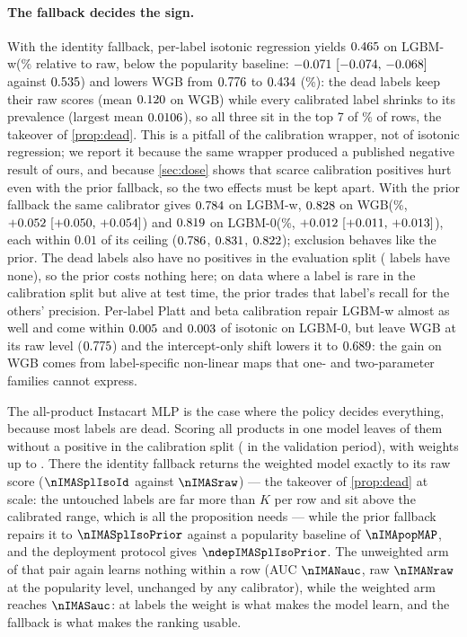 \documentclass[sigconf,nonacm]{acmart}
\newcommand{\Sm}{\textsf{LGBM-w}\xspace}
\newcommand{\Wm}{\textsf{WGB}\xspace}
\newcommand{\Nm}{\textsf{LGBM-0}\xspace}
\begin{document}
\paragraph{The fallback decides the sign.} With the identity fallback, per-label isotonic regression yields $0.465$ on \Sm (\nSplIsoIdRel\% relative to raw, below the popularity baseline: $-0.071~[-0.074,\,-0.068]$ against $0.535$) and lowers \Wm from $0.776$ to $0.434$ (\nWplIsoIdRel\%): the \nSnDead{} dead labels keep their raw scores (mean $0.120$ on \Wm) while every calibrated label shrinks to its prevalence (largest mean $0.0106$), so all three sit in the top 7 of \nWdeadAllRowsPct\% of rows, the takeover of \cref{prop:dead}. This is a pitfall of the calibration wrapper, not of isotonic regression; we report it because the same wrapper produced a published negative result of ours, and because \cref{sec:dose} shows that scarce calibration positives hurt even with the prior fallback, so the two effects must be kept apart. With the prior fallback the same calibrator gives $0.784$ on \Sm, $0.828$ on \Wm (\nWplIsoPriorRel\%, $+0.052~[+0.050,\,+0.054]$) and $0.819$ on \Nm (\nNplIsoPriorRel\%, $+0.012~[+0.011,\,+0.013]$), each within $0.01$ of its ceiling ($0.786$, $0.831$, $0.822$); exclusion behaves like the prior. The \nSnDead{} dead labels also have no positives in the evaluation split (\nnDeadTest{} labels have none), so the prior costs nothing here; on data where a label is rare in the calibration split but alive at test time, the prior trades that label's recall for the others' precision. Per-label Platt and beta calibration repair \Sm almost as well and come within $0.005$ and $0.003$ of isotonic on \Nm, but leave \Wm at its raw level ($0.775$) and the intercept-only shift lowers it to $0.689$: the gain on \Wm comes from label-specific non-linear maps that one- and two-parameter families cannot express.

The all-product Instacart MLP is the case where the policy decides everything, because most labels are dead. Scoring all \nIMAnLabels{} products in one model leaves \nIMASnDead{} of them without a positive in the calibration split (\nIMASnDeadVal{} in the validation period), with weights up to \nIMAwMax. There the identity fallback returns the weighted model exactly to its raw score ($\nIMASplIsoId$ against $\nIMASraw$) --- the takeover of \cref{prop:dead} at scale: the untouched labels are far more than $K$ per row and sit above the calibrated range, which is all the proposition needs --- while the prior fallback repairs it to $\nIMASplIsoPrior$ against a popularity baseline of $\nIMApopMAP$, and the deployment protocol gives $\ndepIMASplIsoPrior$. The unweighted arm of that pair again learns nothing within a row (AUC $\nIMANauc$, raw $\nIMANraw$ at the popularity level, unchanged by any calibrator), while the weighted arm reaches $\nIMASauc$: at \nIMAnLabels{} labels the weight is what makes the model learn, and the fallback is what makes the ranking usable.
\end{document}
